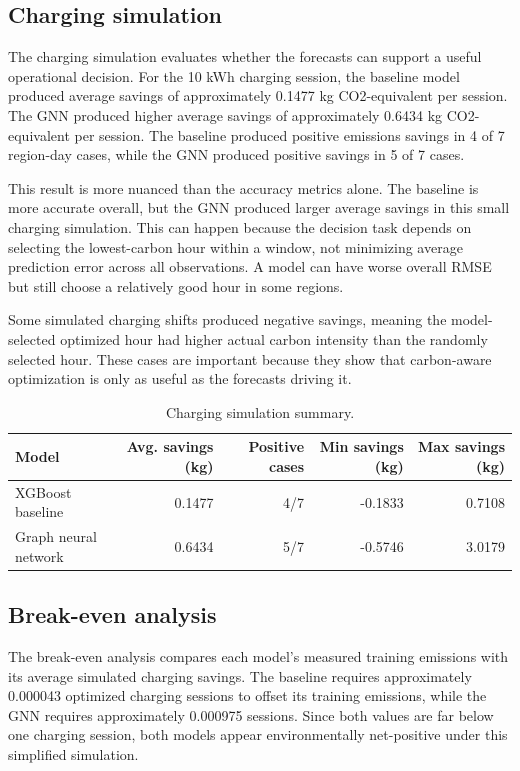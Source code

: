 \documentclass{article}
\begin{document}
\subsection{Charging simulation}

The charging simulation evaluates whether the forecasts can support a useful operational decision. For the 10 kWh charging session, the baseline model produced average savings of approximately 0.1477 kg CO2-equivalent per session. The GNN produced higher average savings of approximately 0.6434 kg CO2-equivalent per session. The baseline produced positive emissions savings in 4 of 7 region-day cases, while the GNN produced positive savings in 5 of 7 cases.

This result is more nuanced than the accuracy metrics alone. The baseline is more accurate overall, but the GNN produced larger average savings in this small charging simulation. This can happen because the decision task depends on selecting the lowest-carbon hour within a window, not minimizing average prediction error across all observations. A model can have worse overall RMSE but still choose a relatively good hour in some regions.

Some simulated charging shifts produced negative savings, meaning the model-selected optimized hour had higher actual carbon intensity than the randomly selected hour. These cases are important because they show that carbon-aware optimization is only as useful as the forecasts driving it.

\begin{table}[h]
  \centering
  \caption{Charging simulation summary.}
  \label{tab:charging-simulation}
  \begin{tabular}{lrrrr}
    \toprule
    Model & Avg. savings (kg) & Positive cases & Min savings (kg) & Max savings (kg) \\
    \midrule
    XGBoost baseline & 0.1477 & 4/7 & -0.1833 & 0.7108 \\
    Graph neural network & 0.6434 & 5/7 & -0.5746 & 3.0179 \\
    \bottomrule
  \end{tabular}
\end{table}

\subsection{Break-even analysis}

The break-even analysis compares each model's measured training emissions with its average simulated charging savings. The baseline requires approximately 0.000043 optimized charging sessions to offset its training emissions, while the GNN requires approximately 0.000975 sessions. Since both values are far below one charging session, both models appear environmentally net-positive under this simplified simulation.
\end{document}
